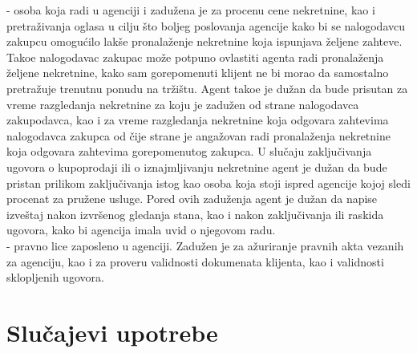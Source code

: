 \documentclass{article}
\begin{document}
 - osoba koja radi u agenciji i zadu\v {z}ena je za procenu cene nekretnine, kao i pretra\v {z}ivanja oglasa u cilju \v {s}to boljeg poslovanja agencije kako bi se nalogodavcu zakupcu omogu\' cilo lak\v {s}e pronala\v {z}enje nekretnine koja ispunjava \v {z}eljene zahteve. Tako\dj e nalogodavac zakupac mo\v {z}e potpuno ovlastiti agenta radi pronala\v {z}enja \v {z}eljene nekretnine, kako sam gorepomenuti klijent ne bi morao da samostalno pretra\v {z}uje trenutnu ponudu na tr\v {z}i\v {s}tu. Agent tako\dj e je du\v {z}an da bude prisutan za vreme razgledanja nekretnine za koju je zadu\v {z}en od strane nalogodavca zakupodavca, kao i za vreme razgledanja nekretnine koja odgovara zahtevima nalogodavca zakupca od \v {c}ije strane je anga\v {z}ovan radi pronala\v {z}enja nekretnine koja odgovara zahtevima gorepomenutog zakupca. U slu\v {c}aju zaklju\v {c}ivanja ugovora o kupoprodaji ili o iznajmljivanju nekretnine agent je du\v {z}an da bude pristan prilikom zaklju\v {c}ivanja istog kao osoba koja stoji ispred agencije kojoj sledi procenat za pru\v {z}ene usluge. Pored ovih zadu\v {z}enja agent je du\v {z}an da napise izve\v {s}taj nakon izvr\v {s}enog gledanja stana, kao i nakon zaklju\v {c}ivanja ili raskida ugovora, kako bi agencija imala uvid o njegovom radu.\\

 - pravno lice zaposleno u agenciji. Zadu\v {z}en je za a\v {z}uriranje pravnih akta vezanih za agenciju, kao i za proveru validnosti dokumenata klijenta, kao i validnosti sklopljenih ugovora.\\ 

\newpage
\section{\bfseries Slu\v{c}ajevi upotrebe}
\end{document}
